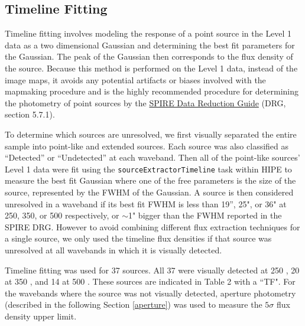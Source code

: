 \subsection{Timeline Fitting}\label{timeline}
Timeline fitting involves modeling the response of a point source in the Level 1 data as a two dimensional Gaussian and determining the best fit parameters for the Gaussian. The peak of the Gaussian then corresponds to the flux density of the source. Because this method is performed on the Level 1 data, instead of the image maps, it avoids any potential artifacts or biases involved with the mapmaking procedure and is the highly recommended procedure for determining the photometry of point sources by the \href{http://herschel.esac.esa.int/hcss-doc-11.0/index.jsp\#spire_drg:_start}{SPIRE Data Reduction Guide} (DRG, section 5.7.1).

To determine which sources are unresolved, we first visually separated the entire sample into point-like and extended sources. Each source was also classified as ``Detected'' or ``Undetected'' at each waveband. Then all of the point-like sources' Level 1 data were fit using the \texttt{sourceExtractorTimeline} task within HIPE to measure the best fit Gaussian where one of the free parameters is the size of the source, represented by the FWHM of the Gaussian. A source is then considered unresolved in a waveband if its best fit FWHM is less than 19'', 25", or 36" at 250, 350, or 500 \um{} respectively, or $\sim$1" bigger than the FWHM reported in the SPIRE DRG. However to avoid combining different flux extraction techniques for a single source, we only used the timeline flux densities if that source was unresolved at all wavebands in which it is visually detected.

Timeline fitting was used for 37 sources. All 37 were visually detected at 250 \um{}, 20 at 350 \um{}, and 14 at 500 \um. These sources are indicated in Table 2 with a ``TF". For the wavebands where the source was not visually detected, aperture photometry (described in the following Section \ref{aperture}) was used to measure the $5\sigma$ flux density upper limit.
  